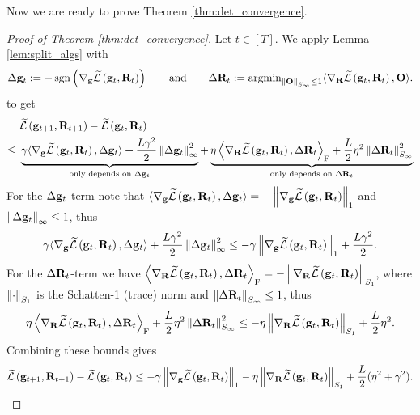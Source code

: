 {Now we are ready to prove Theorem \ref{thm:det_convergence}.

\begin{proof}[Proof of Theorem \ref{thm:det_convergence}]
    Let $t \in [T]$. We apply Lemma \ref{lem:split_algs} with
    \begin{equation*}
        \Delta \g_t := -\operatorname{sgn}\pare{\nabla_\g \Ft\pare{\g_t,\Rbf_t}} \qquad  \text{and} \qquad
        \Delta \Rbf_t := \operatorname{argmin}_{\opnorm{\Obf} \leq 1}\langle \nabla_\Rbf \Ft\pare{\g_t,\Rbf_t}, \Obf \rangle.
    \end{equation*}
    to get
    \begin{align*}
        &\ \Ft\pare{\g_{t+1}, \Rbf_{t+1}} - \Ft\pare{\g_t, \Rbf_t} \\
        \leq &\  
        \underbrace{\gamma \langle \nabla_\g \Ft \pare{\gt, \Rt}, \Delta \g_t\rangle + \frac{L \gamma^2}{2}\norm{\Delta \g_t}_\infty^2}_{\text{only depends on $\Delta \g_t$}}
        + \underbrace{\eta \innerF{\nabla_\Rbf \Ft\pare{\gt,\Rt}}{\Delta \Rbf_t} + \frac{L}{2} \eta^2\opnorm{\Delta \Rbf_t}^2}_{\text{only depends on $\Delta \Rbf_t$}}
    \end{align*}
    For the $\Delta \g_t$-term note that $\langle \nabla_\g \Ft\pare{\gt,\Rt}, \Delta \g_t\rangle = -\norm{\nabla_\g \Ft\pare{\gt,\Rt}}_1$ and $\norm{\Delta \g_t}_\infty \leq 1$, thus
    \begin{equation*}
        \gamma \langle \nabla_\g \Ft\pare{\gt,\Rt}, \Delta \g_t\rangle + \frac{L \gamma^2}{2}\norm{\Delta \g_t}_\infty^2
        \leq
        -\gamma \norm{\nabla_\g \Ft\pare{\gt,\Rt}}_1 + \frac{L \gamma^2}{2}.
    \end{equation*}
    For the $\Delta \Rt$-term we have $\innerF{\nabla_\Rbf \Ft\pare{\gt,\Rt}}{\Delta \Rt} = -\trnorm{\nabla_\Rbf \Ft\pare{\gt,\Rt}}$, where $\trnorm \cdot$ is the Schatten-1 (trace) norm and $\opnorm{\Delta \Rt} \leq 1$, thus
    \begin{equation*}
        \eta \innerF{\nabla_\Rbf \Ft\pare{\gt,\Rt}}{\Delta \Rt} + \frac{L}{2} \eta^2\opnorm{\Delta \Rt}^2
        \leq
        -\eta \trnorm{\nabla_\Rbf \Ft\pare{\gt,\Rt}} + \frac{L}{2} \eta^2.
    \end{equation*}
    Combining these bounds gives
    \begin{equation*}
        \Ft\pare{\g_{t+1}, \Rbf_{t+1}} - \Ft\pare{\g_t, \Rbf_t} 
        \leq
        -\gamma \norm{\nabla_\g \Ft\pare{\gt,\Rt}}_1 -\eta \trnorm{\nabla_\Rbf \Ft\pare{\gt,\Rt}} + \frac{L}{2}(\eta^2 + \gamma^2).
    \end{equation*}

\end{proof}}
